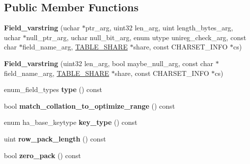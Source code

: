 \subsection*{Public Member Functions}
\begin{DoxyCompactItemize}
\item 
\mbox{\label{classField__varstring_a72b495bc04e301ae35bd4eca3982bf60}} 
{\bfseries Field\+\_\+varstring} (uchar $\ast$ptr\+\_\+arg, uint32 len\+\_\+arg, uint length\+\_\+bytes\+\_\+arg, uchar $\ast$null\+\_\+ptr\+\_\+arg, uchar null\+\_\+bit\+\_\+arg, enum utype unireg\+\_\+check\+\_\+arg, const char $\ast$field\+\_\+name\+\_\+arg, \mbox{\hyperlink{structTABLE__SHARE}{T\+A\+B\+L\+E\+\_\+\+S\+H\+A\+RE}} $\ast$share, const C\+H\+A\+R\+S\+E\+T\+\_\+\+I\+N\+FO $\ast$cs)
\item 
\mbox{\label{classField__varstring_a6bf37bb6c89a3584ef88e5c1c24081a8}} 
{\bfseries Field\+\_\+varstring} (uint32 len\+\_\+arg, bool maybe\+\_\+null\+\_\+arg, const char $\ast$field\+\_\+name\+\_\+arg, \mbox{\hyperlink{structTABLE__SHARE}{T\+A\+B\+L\+E\+\_\+\+S\+H\+A\+RE}} $\ast$share, const C\+H\+A\+R\+S\+E\+T\+\_\+\+I\+N\+FO $\ast$cs)
\item 
\mbox{\label{classField__varstring_a287ee128d1c8f2b668b145bab325b46e}} 
enum\+\_\+field\+\_\+types {\bfseries type} () const
\item 
\mbox{\label{classField__varstring_abf8548532024053564f4ef30f72c7093}} 
bool {\bfseries match\+\_\+collation\+\_\+to\+\_\+optimize\+\_\+range} () const
\item 
\mbox{\label{classField__varstring_a10a90663542f4d63734112a6087a10c7}} 
enum ha\+\_\+base\+\_\+keytype {\bfseries key\+\_\+type} () const
\item 
\mbox{\label{classField__varstring_a12ec0f068aafad4ea86c4aab4719e572}} 
uint {\bfseries row\+\_\+pack\+\_\+length} () const
\item 
\mbox{\label{classField__varstring_a7ddcb72ec67bb84f140977fe918c1f9c}} 
bool {\bfseries zero\+\_\+pack} () const
\item 
\mbox{\label{classField__varstring_a4a3d3b18dd369f044fbd30c8597977c2}} 

\end{DoxyCompactItemize}
